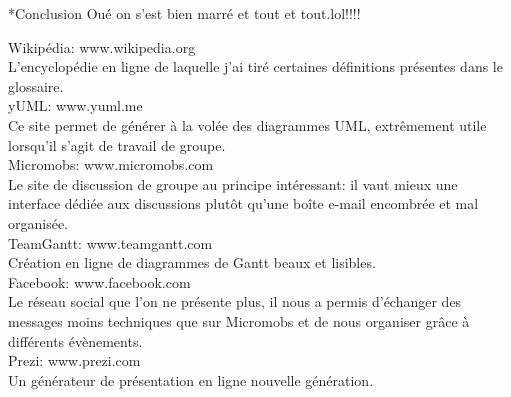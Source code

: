 \documentclass[a4paper, 12pt]{report}
\begin{document}
	\begin{chapter}*{Conclusion}
		Oué on s'est bien marré et tout et tout.lol!!!!
	\end{chapter}
	\renewcommand\glossaryname{Glossaire}
	\renewcommand{\glsnamefont}[1]{\makefirstuc{#1}} %
	\printglossaries
	\renewcommand\bibname{Sitographie}%
	\begin{thebibliography}{2}
		\label{sitographie}
		Wikipédia: www.wikipedia.org \\
		L'encyclopédie en ligne de laquelle j'ai tiré certaines définitions présentes dans le glossaire.
		~\\
		yUML: www.yuml.me \\
		Ce site permet de générer à la volée des diagrammes \gls{UML}, extrêmement utile lorsqu'il s'agit de travail de groupe.
		~\\
		Micromobs: www.micromobs.com \\
		Le site de discussion de groupe au principe intéressant: il vaut mieux une interface dédiée aux discussions plutôt
		qu'une boîte e-mail encombrée et mal organisée.
		~\\
		TeamGantt: www.teamgantt.com \\
		Création en ligne de diagrammes de Gantt beaux et lisibles.
		~\\
		Facebook: www.facebook.com \\
		Le réseau social que l'on ne présente plus, il nous a permis d'échanger des messages moins techniques que sur Micromobs
		et de nous organiser grâce à différents évènements.
		~\\
		Prezi: www.prezi.com \\
		Un générateur de présentation en ligne nouvelle génération.
	\end{thebibliography}
\end{document}
